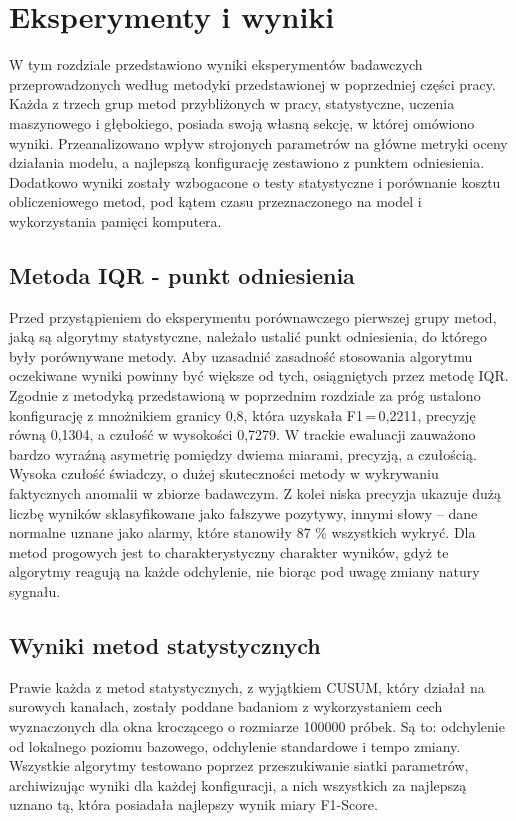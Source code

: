 \documentclass[a4paper,twoside,12pt]{book}
\begin{document}
	
	\chapter{Eksperymenty i wyniki}
	W tym rozdziale przedstawiono wyniki eksperymentów badawczych przeprowadzonych według metodyki przedstawionej w poprzedniej części pracy. Każda z trzech grup metod przybliżonych w pracy, statystyczne, uczenia maszynowego i głębokiego, posiada swoją własną sekcję, w której omówiono wyniki. Przeanalizowano wpływ strojonych parametrów na główne metryki oceny działania modelu, a najlepszą konfigurację zestawiono z punktem odniesienia. Dodatkowo wyniki zostały wzbogacone o testy statystyczne i porównanie kosztu obliczeniowego metod, pod kątem czasu przeznaczonego na model i wykorzystania pamięci komputera. 
	
	\section{Metoda IQR - punkt odniesienia}
	
	Przed przystąpieniem do eksperymentu porównawczego pierwszej grupy metod, jaką są algorytmy statystyczne, należało ustalić punkt odniesienia, do którego były porównywane metody. Aby uzasadnić zasadność stosowania algorytmu oczekiwane wyniki powinny być większe od tych, osiągniętych przez metodę IQR. Zgodnie z metodyką przedstawioną w poprzednim rozdziale za próg ustalono konfigurację z mnożnikiem granicy 0{,}8, która uzyskała F1\,=\,0{,}2211, precyzję równą 0{,}1304, a czułość w wysokości 0{,}7279.
	W trackie ewaluacji zauważono bardzo wyraźną asymetrię pomiędzy dwiema miarami, precyzją, a czułością. Wysoka czułość świadczy, o dużej skuteczności metody w wykrywaniu faktycznych anomalii w zbiorze badawczym. Z kolei niska precyzja ukazuje dużą liczbę wyników sklasyfikowane jako fałszywe pozytywy, innymi słowy – dane normalne uznane jako alarmy, które stanowiły  87 \% wszystkich wykryć. Dla metod progowych jest to charakterystyczny charakter wyników, gdyż te algorytmy reagują na każde odchylenie, nie biorąc pod uwagę zmiany natury sygnału. 
	
	\section{Wyniki metod statystycznych}
	Prawie każda z metod statystycznych, z wyjątkiem CUSUM, który działał na surowych kanałach, zostały poddane badaniom z wykorzystaniem cech wyznaczonych dla okna kroczącego o rozmiarze 100000 próbek. Są to: odchylenie od lokalnego poziomu bazowego, odchylenie standardowe i tempo zmiany. Wszystkie algorytmy testowano poprzez przeszukiwanie siatki parametrów, archiwizując wyniki dla każdej konfiguracji, a nich wszystkich za najlepszą uznano tą, która posiadała najlepszy wynik miary F1-Score.
	
\end{document}
